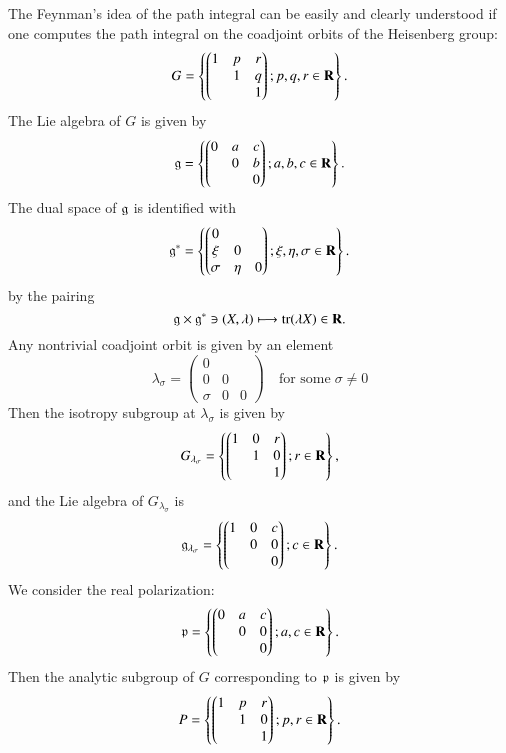 The Feynman's idea of the path integral can be easily and clearly understood if one computes the path integral on the coadjoint orbits of the Heisenberg group:
$$
G= \left\{ \begin{pmatrix}
1 & p & r\\
  &  1 & q\\
  &    & 1
\end{pmatrix}
; p,q,r \in \mathbf{R} \right\}.
$$
The Lie algebra of $G$ is given by
$$
\mathfrak{g} = \left\{ \begin{pmatrix}
0 & a & c\\
  &  0 & b\\
  &    & 0
\end{pmatrix}
; a,b,c \in \mathbf{R} \right\}.
$$
The dual space of $\mathfrak{g}$ is identified with
$$
\mathfrak{g}^{*} = \left\{ \begin{pmatrix}
0 &  & \\
 \xi &  0 & \\
 \sigma & \eta   & 0
\end{pmatrix}
; \xi,\eta, \sigma \in \mathbf{R} \right\}.
$$
by the pairing
$$
\mathfrak{g} \times \mathfrak{g}^{*} \ni (X, \lambda) \longmapsto {\rm tr}(\lambda X) \in \mathbf{R}.
$$
Any nontrivial coadjoint orbit is given by an element
$$
\lambda_{\sigma} = \begin{pmatrix}
0 &  &  \\
 0 &  0 & \\
 \sigma & 0  & 0
\end{pmatrix}
\quad \text{for some} \; \sigma \neq 0
$$
Then the isotropy subgroup at $\lambda_{\sigma}$ is given by
$$
G_{\lambda_{\sigma}} = \left\{ \begin{pmatrix}
1 & 0 & r \\
  &  1 & 0\\
  &    & 1
\end{pmatrix}
; r \in \mathbf{R} \right\},
$$
and the Lie algebra of $G_{\lambda_{\sigma}}$ is
$$
\mathfrak{g}_{\lambda_{\sigma}}= \left\{ \begin{pmatrix}
1 & 0 & c \\
  &  0 & 0\\
  &    & 0
\end{pmatrix}
; c \in \mathbf{R} \right\}.
$$
We consider the real polarization:
$$
\mathfrak{p}= \left\{ \begin{pmatrix}
0 & a & c \\
  &  0 & 0\\
  &    & 0
\end{pmatrix}
; a, c \in \mathbf{R} \right\}.
$$
Then the analytic subgroup of $G$ corresponding to $\mathfrak{p}$ is given by
$$
P= \left\{ \begin{pmatrix}
1 & p & r \\
  &  1 & 0\\
  &    & 1
\end{pmatrix}
; p, r \in \mathbf{R} \right\}.
$$
